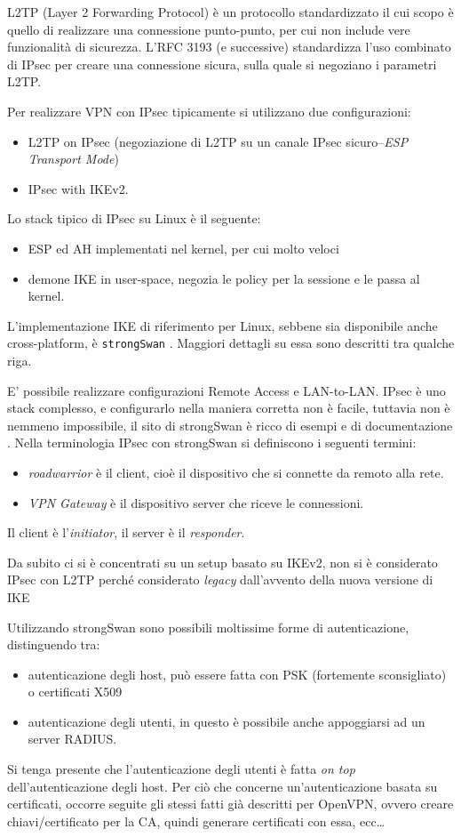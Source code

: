 L2TP (Layer 2 Forwarding Protocol) è un protocollo standardizzato il cui scopo è quello
di realizzare una connessione punto-punto, per cui non include vere funzionalità
di sicurezza. L'RFC 3193 (e successive) standardizza l'uso combinato di IPsec per creare una
connessione sicura, sulla quale si negoziano
i parametri L2TP.


Per realizzare VPN con IPsec tipicamente si utilizzano due configurazioni:
\begin{itemize}
  \item L2TP on IPsec (negoziazione di L2TP su un canale IPsec sicuro--\textit{ESP Transport Mode})
  \item IPsec with IKEv2.
\end{itemize}


Lo stack tipico di IPsec su Linux è il seguente:
\begin{itemize}
  \item ESP ed AH implementati nel kernel, per cui molto veloci
  \item demone IKE in user-space, negozia le policy per la sessione e le
  passa al kernel.
\end{itemize}
L'implementazione IKE di riferimento per Linux, sebbene sia disponibile anche
cross-platform, è \texttt{strongSwan} \cite{strongswan}. Maggiori dettagli su essa sono descritti
tra qualche riga.


E' possibile realizzare configurazioni Remote Access e LAN-to-LAN. IPsec è uno stack
complesso, e configurarlo nella maniera corretta non è facile, tuttavia non è nemmeno
impossibile, il sito di strongSwan è ricco di esempi e di documentazione \cite{strongswan-example}.
Nella terminologia IPsec con strongSwan si definiscono i seguenti termini:
\begin{itemize}
  \item \textit{roadwarrior} è il client, cioè il dispositivo che si connette da remoto alla rete.
  \item \textit{VPN Gateway} è il dispositivo server che riceve le connessioni.
\end{itemize}
Il client è l'\textit{initiator},
il server è il \textit{responder}.

Da subito ci si è concentrati su un setup basato su IKEv2, non si è considerato IPsec con L2TP
perché considerato \textit{legacy} dall'avvento della nuova versione di IKE

Utilizzando strongSwan sono possibili moltissime forme di autenticazione, distinguendo tra:
\begin{itemize}
  \item autenticazione degli host, può essere fatta con PSK (fortemente sconsigliato) o certificati X509
  \item autenticazione degli utenti, in questo è possibile anche appoggiarsi ad un
  server RADIUS.
\end{itemize}
Si tenga presente che l'autenticazione degli utenti è fatta \textit{on top} dell'autenticazione
degli host.
Per ciò che concerne un'autenticazione basata su certificati, occorre seguite gli stessi
fatti già descritti per OpenVPN, ovvero creare chiavi/certificato per la CA, quindi generare
certificati con essa, ecc\ldots



